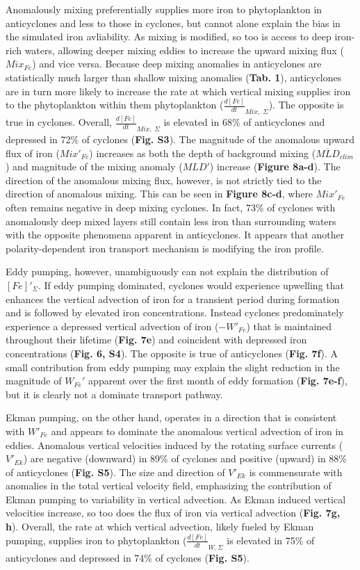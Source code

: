 \documentclass{article}
\begin{document}
Anomalously mixing preferentially supplies more iron to phytoplankton in anticyclones and less to those in cyclones, but cannot alone explain the bias in the simulated iron avliability. As mixing is modified, so too is access to deep iron-rich waters, allowing deeper mixing eddies to increase the upward mixing flux ($Mix_{Fe}$) and vice versa. Because deep mixing anomalies in anticyclones are statistically much larger than shallow mixing anomalies (\textbf{Tab. 1}), anticyclones are in turn more likely to increase the rate at which vertical mixing supplies iron to the phytoplankton within them phytoplankton ($\frac{d[Fe]}{dt}_{Mix, \; \Sigma}$). The opposite is true in cyclones. Overall, $\frac{d[Fe]}{dt}_{Mix, \; \Sigma}$ is elevated in 68\% of anticyclones and depressed in 72\% of cyclones (\textbf{Fig. S3}). The magnitude of the anomalous upward flux of iron ($Mix'_{Fe}$) increases as both the depth of background mixing ($\overline{MLD}_{clim}$) and magnitude of the mixing anomaly ($MLD'$) increase (\textbf{Figure 8a-d}). The direction of the anomalous mixing flux, however, is not strictly tied to the direction of anomalous mixing. This can be seen in \textbf{Figure 8c-d}, where $Mix'_{Fe}$ often remains negative in deep mixing cyclones. In fact, 73\% of cyclones with anomalously deep mixed layers still contain less iron than surrounding waters with the opposite phenomena apparent in anticyclones. It appears that another polarity-dependent iron transport mechanism is modifying the iron profile. 

Eddy pumping, however, unambiguously can not explain the distribution of $[Fe]'_\Sigma$. If eddy pumping dominated, cyclones would experience upwelling that enhances the vertical advection of iron for a transient period during formation and is followed by elevated iron concentrations. Instead cyclones predominately experience a depressed vertical advection of iron ($-W'_{Fe}$) that is maintained throughout their lifetime (\textbf{Fig. 7e}) and coincident with depressed iron concentrations (\textbf{Fig. 6, S4}). The opposite is true of anticyclones (\textbf{Fig. 7f}). A small contribution from eddy pumping may explain the slight reduction in the magnitude of $W_{Fe}'$ apparent over the first month of eddy formation (\textbf{Fig. 7e-f}), but it is clearly not a dominate transport pathway. 

Ekman pumping, on the other hand, operates in a direction that is consistent with $W'_{Fe}$ and appears to dominate the anomalous vertical advection of iron in eddies. Anomalous vertical velocities induced by the rotating surface currents ($V'_{Ek}$) are negative (downward) in 89\% of cyclones and positive (upward) in 88\% of anticyclones (\textbf{Fig. S5}). The size and direction of $V'_{Ek}$ is commensurate with anomalies in the total vertical velocity field, emphasizing the contribution of Ekman pumping to variability in vertical advection. As Ekman induced vertical velocities increase, so too does the flux of iron via vertical advection (\textbf{Fig. 7g, h}). Overall, the rate at which vertical advection, likely fueled by Ekman pumping, supplies iron to phytoplankton ($\frac{d[Fe]}{dt}_{W, \Sigma}$ is elevated in 75\% of anticyclones and depressed in 74\% of cyclones (\textbf{Fig. S5}).
\end{document}
